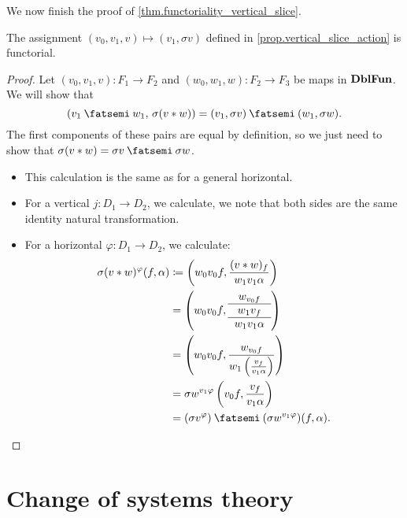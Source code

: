 \documentclass[DynamicalBook]{subfiles}
\begin{document}
We now finish the proof of \cref{thm.functoriality_vertical_slice}.
\begin{lemma}
The assignment $(v_0, v_1, v) \mapsto (v_1, \sigma v)$ defined in
\cref{prop.vertical_slice_action} is functorial.
\end{lemma}
\begin{proof}
Let $(v_0, v_1, v) : F_1 \to F_2$ and $(w_0, w_1, w) : F_2 \to F_3$ be maps in
$\textbf{DblFun}$. We will show that
$$(v_1 \then w_1,\, \sigma(v \ast w)) = (v_1, \sigma v) \then (w_1, \sigma w).$$
The first components of these pairs are equal by definition, so we just need to
show that $\sigma(v \ast w) = \sigma v \then \sigma w$.
\begin{itemize}
\item This calculation is the same as for a general horizontal. 
  \item For a vertical $j : D_1 \to D_2$, we calculate, we note that both sides
    are the same identity natural transformation.
  \item For a horizontal $\varphi : D_1 \to D_2$, we calculate:
  \begin{align*}
\sigma(v \ast w)^{\varphi}(f, \alpha) &\coloneqq \left( w_0v_0f, \frac{(v \ast w)_f}{w_1
    v_1 \alpha} \right)  \\ 
    &= \left( w_0 v_0 f, {\begin{tabular}{c} $w_{v_0 f}$\\ \hline $w_1 v_f$ \\ \hline $w_1 v_1 \alpha$ \end{tabular}} \right) \\
                              &= \left( w_0v_0 f, \frac{w_{v_0 f}}{w_1 \left( \frac{v_f}{v_1 \alpha} \right)} \right) \\
                              &= \sigma w^{v_1 \varphi} \left( v_0 f, \frac{v_f}{v_1 \alpha} \right) \\
    &= (\sigma v^{\varphi}) \then (\sigma w^{v_1 \varphi})(f, \alpha).
    \end{align*}
\end{itemize}
\end{proof}

\section{Change of systems theory}
\end{document}
